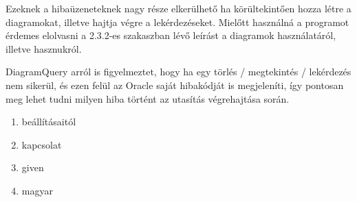 Ezeknek a hibaüzeneteknek nagy része elkerülhető ha körültekintően hozza létre a diagramokat, illetve hajtja végre a lekérdezéseket. Mielőtt használná a programot
érdemes elolvasni a 2.3.2-es szakaszban lévő leírást a diagramok használatáról, illetve hasznukról.

DiagramQuery arról is figyelmeztet, hogy ha egy törlés / megtekintés / lekérdezés nem sikerül, és ezen felül az Oracle saját hibakódját is megjeleníti, így pontosan
meg lehet tudni milyen hiba történt az utasítás végrehajtása során.


\begin{enumerate}
  \item beállításaitól
  \item kapcsolat
  \item given
  \item magyar
\end{enumerate}